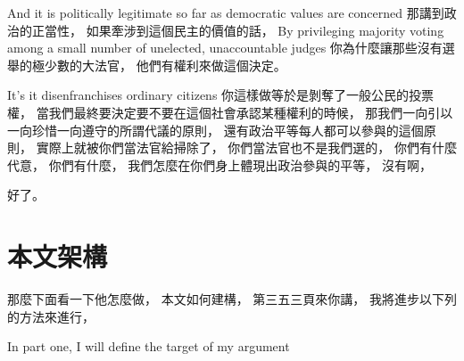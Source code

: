 \hypertarget{w06:cue:339}{}And it is politically legitimate so far as democratic values are concerned
\hypertarget{w06:cue:340}{}那講到政治的正當性，
\hypertarget{w06:cue:341}{}如果牽涉到這個民主的價值的話，
\hypertarget{w06:cue:342}{}By privileging majority voting
\hypertarget{w06:cue:343}{}among a small number of unelected, unaccountable judges
\hypertarget{w06:cue:344}{}你為什麼讓那些沒有選舉的極少數的大法官，
\hypertarget{w06:cue:345}{}他們有權利來做這個決定。

\hypertarget{w06:cue:346}{}It's it disenfranchises ordinary citizens
\hypertarget{w06:cue:347}{}你這樣做等於是剝奪了一般公民的投票權，
\hypertarget{w06:cue:348}{}當我們最終要決定要不要在這個社會承認某種權利的時候，
\hypertarget{w06:cue:349}{}那我們一向引以一向珍惜一向遵守的所謂代議的原則，
\hypertarget{w06:cue:350}{}還有政治平等每人都可以參與的這個原則，
\hypertarget{w06:cue:351}{}實際上就被你們當法官給掃除了，
\hypertarget{w06:cue:352}{}你們當法官也不是我們選的，
\hypertarget{w06:cue:353}{}你們有什麼代意，
\hypertarget{w06:cue:354}{}你們有什麼，
\hypertarget{w06:cue:355}{}我們怎麼在你們身上體現出政治參與的平等，
\hypertarget{w06:cue:356}{}沒有啊，

\hypertarget{w06:cue:357}{}好了。

\section{本文架構}

\hypertarget{w06:cue:358}{}那麼下面看一下他怎麼做，
\hypertarget{w06:cue:359}{}本文如何建構，
\hypertarget{w06:cue:360}{}第三五三頁來你講，
\hypertarget{w06:cue:361}{}我將進步以下列的方法來進行，

\hypertarget{w06:cue:362}{}In part one, I will define the target of my argument

